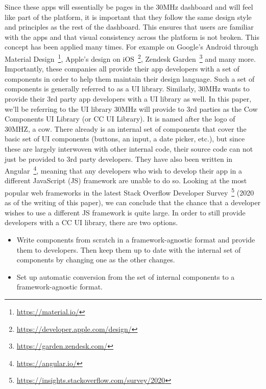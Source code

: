 Since these apps will essentially be pages in the 30MHz dashboard and will feel like part of the platform, it is important that they follow the same design style and principles as the rest of the dashboard. This ensures that users are familiar with the apps and that visual consistency across the platform is not broken. This concept has been applied many times. For example on Google's Android through Material Design~\footnote{\url{https://material.io/}}, Apple's design on iOS~\footnote{\url{https://developer.apple.com/design/}}, Zendesk Garden~\footnote{\url{https://garden.zendesk.com/}} and many more. Importantly, these companies all provide their app developers with a set of components in order to help them maintain their design language. Such a set of components is generally referred to as a UI library. Similarly, 30MHz wants to provide their 3rd party app developers with a UI library as well. In this paper, we'll be referring to the UI library 30MHz will provide to 3rd parties as the Cow Components UI Library (or CC UI Library). It is named after the logo of 30MHZ, a cow. There already is an internal set of components that cover the basic set of UI components (buttons, an input, a date picker, etc.), but since these are largely interwoven with other internal code, their source code can not just be provided to 3rd party developers. They have also been written in Angular~\footnote{\url{https://angular.io/}}, meaning that any developers who wish to develop their app in a different JavaScript (JS) framework are unable to do so. Looking at the most popular web frameworks in the latest Stack Overflow Developer Survey~\footnote{\url{https://insights.stackoverflow.com/survey/2020}} (2020 as of the writing of this paper), we can conclude that the chance that a developer wishes to use a different JS framework is quite large. In order to still provide developers with a CC UI library, there are two options.

\begin{itemize}
	\item Write components from scratch in a framework-agnostic format and provide them to developers. Then keep them up to date with the internal set of components by changing one as the other changes.
	\item Set up automatic conversion from the set of internal components to a framework-agnostic format.
\end{itemize}

